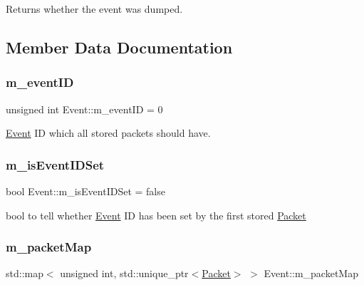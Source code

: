 Returns whether the event was dumped. 



\subsection{Member Data Documentation}
\mbox{\label{class_event_af0c352ab6a128f9df56b231d941aff25}} 
\subsubsection{\texorpdfstring{m\+\_\+event\+ID}{m\_eventID}}
{\footnotesize\ttfamily unsigned int Event\+::m\+\_\+event\+ID = 0\hspace{0.3cm}{\ttfamily [private]}}



\hyperlink{class_event}{Event} ID which all stored packets should have. 

\mbox{\label{class_event_a3b435b2fe840647c01ae0ee838b66a54}} 
\subsubsection{\texorpdfstring{m\+\_\+is\+Event\+I\+D\+Set}{m\_isEventIDSet}}
{\footnotesize\ttfamily bool Event\+::m\+\_\+is\+Event\+I\+D\+Set = false\hspace{0.3cm}{\ttfamily [private]}}



bool to tell whether \hyperlink{class_event}{Event} ID has been set by the first stored \hyperlink{class_packet}{Packet} 

\mbox{\label{class_event_a6aabddb7af6189a884d8eacd582bc10f}} 
\subsubsection{\texorpdfstring{m\+\_\+packet\+Map}{m\_packetMap}}
{\footnotesize\ttfamily std\+::map$<$ unsigned int, std\+::unique\+\_\+ptr$<$\hyperlink{class_packet}{Packet}$>$ $>$ Event\+::m\+\_\+packet\+Map\hspace{0.3cm}{\ttfamily [private]}}



